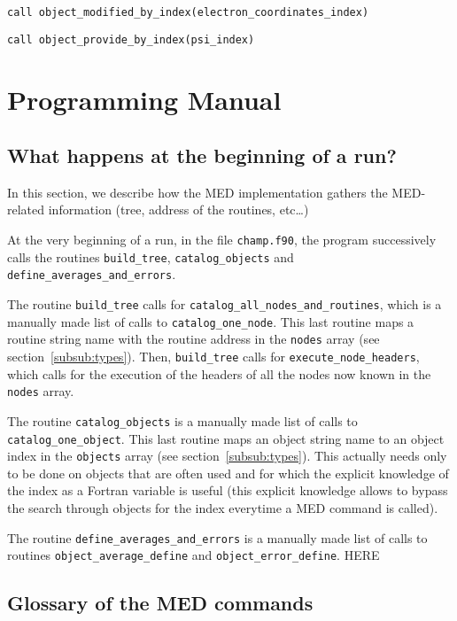 \documentclass[a4paper,11pt]{article}
\begin{document}
\vspace{0.5cm}
\noindent
{\tt call object_modified_by_index(electron_coordinates_index)}

\vspace{0.5cm}
\noindent
{\tt call object_provide_by_index(psi_index)}


\section{Programming Manual}

\subsection{What happens at the beginning of a run?}
\label{sub:begin}

In this section, we describe how the MED implementation gathers the MED-related information (tree, address of the routines, etc\dots)

At the very beginning of a run, in the file {\tt champ.f90}, the program successively calls the routines {\tt build_tree}, {\tt catalog_objects} and {\tt define_averages_and_errors}.

The routine {\tt build_tree} calls for {\tt catalog_all_nodes_and_routines}, which is a manually made list of calls to {\tt catalog_one_node}. This last routine maps a routine string name with the routine address in the {\tt nodes} array (see section~\ref{subsub:types}). Then, {\tt build_tree} calls for {\tt execute_node_headers}, which calls for the execution of the headers of all the nodes now known in the {\tt nodes} array.

The routine {\tt catalog_objects} is a manually made list of calls to {\tt catalog_one_object}. This last routine maps an object string name to an object index in the {\tt objects} array (see section~\ref{subsub:types}). This actually needs only to be done on objects that are often used and for which the explicit knowledge of the index as a Fortran variable is useful (this explicit knowledge allows to bypass the search through objects for the index everytime a MED command is called).

The routine {\tt define_averages_and_errors} is a manually made list of calls to routines {\tt object_average_define} and {\tt object_error_define}.
HERE

\subsection{Glossary of the MED commands}
\end{document}
